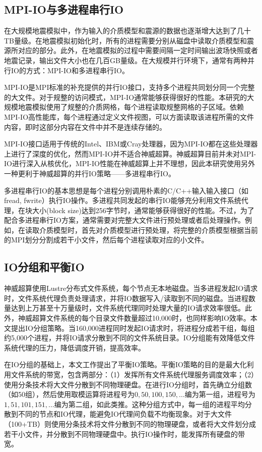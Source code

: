 \subsection{MPI-IO与多进程串行IO}

在大规模地震模拟中，作为输入的介质模型和震源的数据也逐渐增大达到了几十TB量级。在地震模拟初始化时，所有的进程需要分别从磁盘中读取介质模型和震源所对应的部分。此外，在地震模拟的过程中需要间隔一定时间输出波场快照或者地震记录，输出文件大小也在几百GB量级。在大规模并行环境下，通常有两种并行IO的方式：MPI-IO和多进程串行IO。

MPI-IO是MPI标准的补充提供的并行IO接口，支持多个进程共同划分同一个完整的大文件。对于规整的访问模式，MPI-IO通常能够获得很好的性能。本研究的大规模地震模拟使用了规整的介质网格，每个进程读取规整网格的子区域。依赖MPI-IO高性能库，每个进程通过定义文件视图，可以方面读取该进程所需的文件内容，即时这部分内容在文件中并不是连续存储的。

MPI-IO接口适用于传统的Intel、IBM或Cray处理器，因为MPI-IO都在这些处理器上进行了深度的优化，然而MPI-IO并不适合神威超算。神威超算目前并未对MPI-IO进行深入从核优化，MPI-IO性能在神威超算上并不理想，因此本研究使用另外一种更利于神威超算的并行IO策略——多进程串行IO。

多进程串行IO的基本思想是每个进程分别调用朴素的C/C++输入输入接口（如fread, fwrite）执行IO操作。多进程共同发起的串行IO能够充分利用文件系统代理，在块大小(block size)达到256字节时，通常能够获得很好的性能。不过，为了配合多进程串行IO方案，通常需要对完整大文件进行预处理或者后处理操作。例如，在读取介质模型时，首先对介质模型进行预处理，将完整的介质模型根据当前的MPI划分分割成若干小文件，然后每个进程读取对应的小文件。

\subsection{IO分组和平衡IO}

神威超算使用Lustre分布式文件系统，每个节点无本地磁盘。当多进程发起IO请求时，文件系统代理负责处理请求，并将IO数据写入/读取到不同的磁盘。当进程数量达到上万甚至十万量级时，文件系统代理同时处理大量的IO请求效率很低。此外，神威超算文件系统的每个目录文件数量超过10,000时，也同样影响IO效率。本文提出IO分组策略。当160,000进程同时发起IO请求时，将进程分成若干组，每组约5,000个进程，并将IO请求分散到不同的文件系统目录。IO分组能有效降低文件系统代理的压力，降低调度开销，提高效率。

在IO分组的基础上，本文工作提出了平衡IO策略。平衡IO策略的目的是最大化利用文件系统的带宽，包含两部分：（1）发挥所有文件系统代理服务调度效率；（2）使用分条技术将大文件分散到不同物理硬盘。在进行IO分组时，首先确立分组数（如50组），然后使用取模运算将进程号为$0,50,100,150,\ldots$编为第一组，进程号为$1,51,101,151,\ldots$编为第二组，如此类推。这种分组方式中，每一组的进程平均分散到不同的节点和IO代理，能避免IO代理间负载不均衡现象。对于大文件（100+TB）则使用分条技术将文件分散到不同的物理硬盘，或者将大文件划分成若干小文件，并分散到不同物理硬盘中。执行IO操作时，能发挥所有硬盘的带宽。


